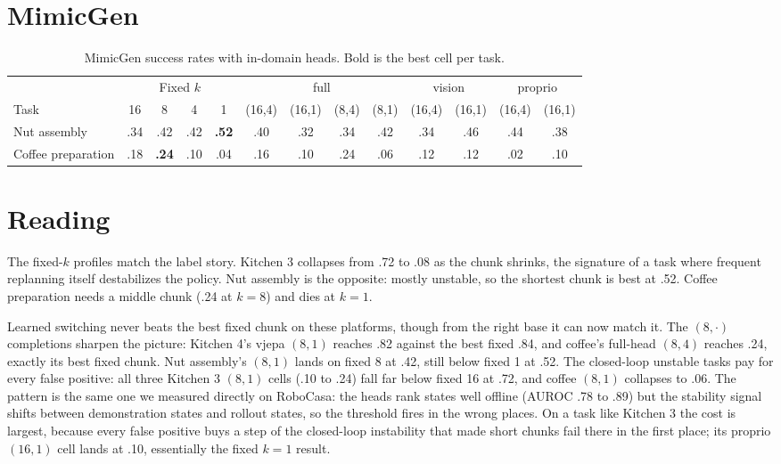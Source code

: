 \documentclass[11pt]{article}
\begin{document}
\section*{MimicGen}
\begin{table}[h]
\centering
\small
\setlength{\tabcolsep}{4pt}
\begin{tabular}{lcccccccccccc}
\toprule
& \multicolumn{4}{c}{Fixed $k$} & \multicolumn{4}{c}{full} & \multicolumn{2}{c}{vision} & \multicolumn{2}{c}{proprio} \\
\cmidrule(lr){2-5}\cmidrule(lr){6-9}\cmidrule(lr){10-11}\cmidrule(lr){12-13}
Task & 16 & 8 & 4 & 1 & (16,4) & (16,1) & (8,4) & (8,1) & (16,4) & (16,1) & (16,4) & (16,1) \\
\midrule
Nut assembly & .34 & .42 & .42 & \textbf{.52} & .40 & .32 & .34 & .42 & .34 & .46 & .44 & .38 \\
Coffee preparation & .18 & \textbf{.24} & .10 & .04 & .16 & .10 & .24 & .06 & .12 & .12 & .02 & .10 \\
\bottomrule
\end{tabular}
\caption{MimicGen success rates with in-domain heads. Bold is the best cell
per task.}
\end{table}

\section*{Reading}
The fixed-$k$ profiles match the label story. Kitchen 3 collapses from .72
to .08 as the chunk shrinks, the signature of a task where frequent
replanning itself destabilizes the policy. Nut assembly is the opposite:
mostly unstable, so the shortest chunk is best at .52. Coffee preparation
needs a middle chunk (.24 at $k{=}8$) and dies at $k{=}1$.

Learned switching never beats the best fixed chunk on these platforms,
though from the right base it can now match it. The $(8,\cdot)$
completions sharpen the picture: Kitchen 4's vjepa $(8,1)$ reaches .82
against the best fixed .84, and coffee's full-head $(8,4)$ reaches .24,
exactly its best fixed chunk. Nut assembly's $(8,1)$ lands on fixed 8 at
.42, still below fixed 1 at .52. The closed-loop unstable tasks pay for
every false positive: all three Kitchen 3 $(8,1)$ cells (.10 to .24) fall
far below fixed 16 at .72, and coffee $(8,1)$ collapses to .06. The
pattern is the same one we measured directly on RoboCasa: the heads rank
states well offline (AUROC .78 to .89) but the stability signal shifts
between demonstration states and rollout states, so the threshold fires in
the wrong places. On a task like Kitchen 3 the cost is largest, because
every false positive buys a step of the closed-loop instability that made
short chunks fail there in the first place; its proprio $(16,1)$ cell lands
at .10, essentially the fixed $k{=}1$ result.
\end{document}
